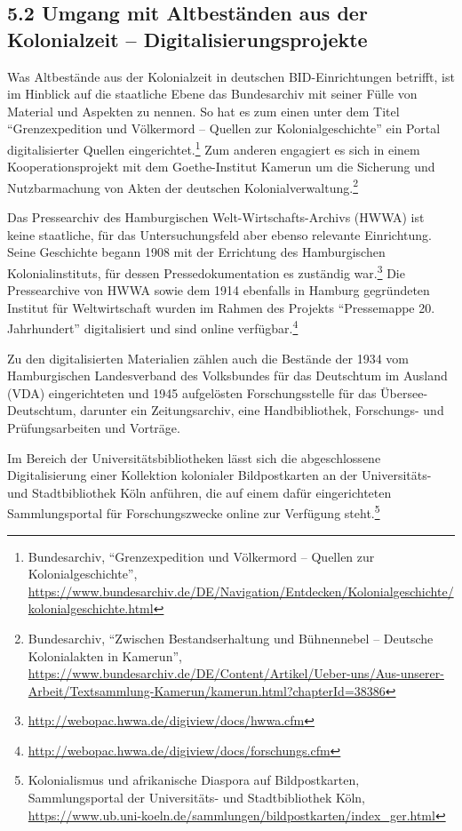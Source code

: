 \documentclass[a4paper,
fontsize=11pt,
oneside,
numbers=noperiodatend,
parskip=half-,
bibliography=totoc,
final
]{scrartcl}
\begin{document}
\hypertarget{umgang-mit-altbestuxe4nden-aus-der-kolonialzeit-digitalisierungsprojekte}{%
\subsection{5.2 Umgang mit Altbeständen aus der Kolonialzeit --
Digitalisierungsprojekte}\label{umgang-mit-altbestuxe4nden-aus-der-kolonialzeit-digitalisierungsprojekte}}

Was Altbestände aus der Kolonialzeit in deutschen BID-Einrichtungen
betrifft, ist im Hinblick auf die staatliche Ebene das Bundesarchiv mit
seiner Fülle von Material und Aspekten zu nennen. So hat es zum einen
unter dem Titel \enquote{Grenzexpedition und Völkermord -- Quellen zur
Kolonialgeschichte} ein Portal digitalisierter Quellen
eingerichtet.\footnote{Bundesarchiv, \enquote{Grenzexpedition und
  Völkermord -- Quellen zur Kolonialgeschichte},
  \url{https://www.bundesarchiv.de/DE/Navigation/Entdecken/Kolonialgeschichte/kolonialgeschichte.html}}
Zum anderen engagiert es sich in einem Kooperationsprojekt mit dem
Goethe-Institut Kamerun um die Sicherung und Nutzbarmachung von Akten
der deutschen Kolonialverwaltung.\footnote{Bundesarchiv,
  \enquote{Zwischen Bestandserhaltung und Bühnennebel -- Deutsche
  Kolonialakten in Kamerun},
  \url{https://www.bundesarchiv.de/DE/Content/Artikel/Ueber-uns/Aus-unserer-Arbeit/Textsammlung-Kamerun/kamerun.html?chapterId=38386}}

Das Pressearchiv des Hamburgischen Welt-Wirtschafts-Archivs (HWWA) ist
keine staatliche, für das Untersuchungsfeld aber ebenso relevante
Einrichtung. Seine Geschichte begann 1908 mit der Errichtung des
Hamburgischen Kolonialinstituts, für dessen Pressedokumentation es
zuständig war.\footnote{\url{http://webopac.hwwa.de/digiview/docs/hwwa.cfm}}
Die Pressearchive von HWWA sowie dem 1914 ebenfalls in Hamburg
gegründeten Institut für Weltwirtschaft wurden im Rahmen des Projekts
\enquote{Pressemappe 20. Jahrhundert} digitalisiert und sind online
verfügbar.\footnote{\url{http://webopac.hwwa.de/digiview/docs/forschungs.cfm}}

Zu den digitalisierten Materialien zählen auch die Bestände der 1934 vom
Hamburgischen Landesverband des Volksbundes für das Deutschtum im
Ausland (VDA) eingerichteten und 1945 aufgelösten Forschungsstelle für
das Übersee-Deutschtum, darunter ein Zeitungsarchiv, eine
Handbibliothek, Forschungs- und Prüfungsarbeiten und Vorträge.

Im Bereich der Universitätsbibliotheken lässt sich die abgeschlossene
Digitalisierung einer Kollektion kolonialer Bildpostkarten an der
Universitäts- und Stadtbibliothek Köln anführen, die auf einem dafür
eingerichteten Sammlungsportal für Forschungszwecke online zur Verfügung
steht.\footnote{Kolonialismus und afrikanische Diaspora auf
  Bildpostkarten, Sammlungsportal der Universitäts- und Stadtbibliothek
  Köln,
  \url{https://www.ub.uni-koeln.de/sammlungen/bildpostkarten/index_ger.html}}
\end{document}
